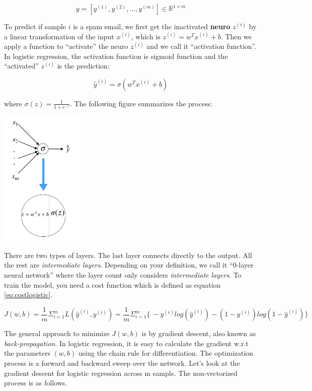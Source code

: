 \documentclass[12pt,]{krantz}
\theoremstyle{definition}
\theoremstyle{definition}
\theoremstyle{definition}
\theoremstyle{remark}
\begin{document}
\[y=[y^{(1)},y^{(2)},\dots,y^{(m)}] \in \mathbb{R}^{1 \times m}\]

To predict if sample \(i\) is a spam email, we first get the inactivated
\textbf{neuro} \(z^{(i)}\) by a linear transformation of the input
\(x^{(i)}\), which is \(z^{(i)}=w^Tx^{(i)} + b\). Then we apply a
function to ``activate'' the neuro \(z^{(i)}\) and we call it
``activation function''. In logistic regression, the activation function
is sigmoid function and the ``activated'' \(z^{(i)}\) is the prediction:

\[\hat{y}^{(i)} = \sigma(w^Tx^{(i)} + b)\]

where \(\sigma(z) = \frac{1}{1+e^{-z}}\). The following figure
summarizes the process:

\includegraphics[width=0.30000\textwidth]{images/dnn0.png}

There are two types of layers. The last layer connects directly to the
output. All the rest are \emph{intermediate layers}. Depending on your
definition, we call it ``0-layer neural network'' where the layer count
only considers \emph{intermediate layers}. To train the model, you need
a cost function which is defined as equation \eqref{eq:costlogistic}.

\begin{equation}
J(w,b)=\frac{1}{m} \Sigma_{i=1}^m L(\hat{y}^{(i)}, y^{(i)}) = \frac{1}{m} \Sigma_{i=1}^{m} \{\ -y^{(i)}log(\hat{y}^{(i)})-(1-y^{(i)})log(1-\hat{y}^{(i)}) \}
\label{eq:costlogistic}
\end{equation}

The general approach to minimize \(J(w,b)\) is by gradient descent, also
known as \emph{back-propagation}. In logistic regression, it is easy to
calculate the gradient w.r.t the parameters \((w, b)\) using the chain
rule for differentiation. The optimization process is a forward and
backward sweep over the network. Let's look at the gradient descent for
logistic regression across m sample. The non-vectorized process is as
follows.
\end{document}
